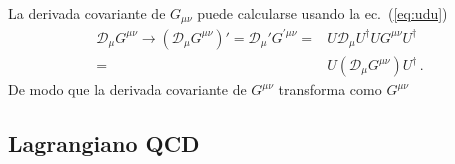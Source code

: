  La derivada covariante de ${G}_{\mu\nu}$ puede calcularse usando la ec.~(\ref{eq:udu})
\begin{align}
  \mathcal{D}_{\mu}{G}^{\mu\nu} \to \left(  \mathcal{D}_{\mu}{G}^{\mu\nu}  \right)'=
  \mathcal{D}_{\mu}'{G}^{\prime \mu\nu}
  =&U \mathcal{D}_{\mu}U^{\dagger} U {G}^{\mu\nu}  U^{\dagger}\nonumber\\
  =&U \left(   \mathcal{D}_{\mu}  {G}^{\mu\nu} \right) U^{\dagger}\,.
\end{align}
De modo que la derivada covariante de ${G}^{\mu\nu}$ transforma como ${G}^{\mu\nu}$



\subsection{Lagrangiano QCD}

